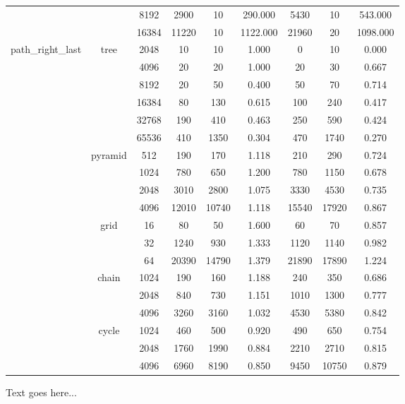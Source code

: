 \begin{table}
{\begin{tabular}{c|c|c|c|c|c|c|c|c}
   &  &  8192 &  2900 & 10 &  290.000  & 5430 & 10 &  543.000 \\
   &  &  16384 &  11220 & 10 &  1122.000  & 21960 & 20 &  1098.000 \\
   \cline{2-9}
   \hline
   \multirow{19}{*}{path\_right\_last} &  \multirow{6}{*}{tree} &  2048 &  10 & 10 &  1.000  & 0 & 10 &  0.000 \\
   &  &  4096 &  20 & 20 &  1.000  & 20 & 30 &  0.667 \\
   &  &  8192 &  20 & 50 &  0.400  & 50 & 70 &  0.714 \\
   &  &  16384 &  80 & 130 &  0.615  & 100 & 240 &  0.417 \\
   &  &  32768 &  190 & 410 &  0.463  & 250 & 590 &  0.424 \\
   &  &  65536 &  410 & 1350 &  0.304  & 470 & 1740 &  0.270 \\
   \cline{2-9}
   &  \multirow{4}{*}{pyramid} &  512 &  190 & 170 &  1.118  & 210 & 290 &  0.724 \\
   &  &  1024 &  780 & 650 &  1.200  & 780 & 1150 &  0.678 \\
   &  &  2048 &  3010 & 2800 &  1.075  & 3330 & 4530 &  0.735 \\
   &  &  4096 &  12010 & 10740 &  1.118  & 15540 & 17920 &  0.867 \\
   \cline{2-9}
   &  \multirow{3}{*}{grid} &  16 &  80 & 50 &  1.600  & 60 & 70 &  0.857 \\
   &  &  32 &  1240 & 930 &  1.333  & 1120 & 1140 &  0.982 \\
   &  &  64 &  20390 & 14790 &  1.379  & 21890 & 17890 &  1.224 \\
   \cline{2-9}
   &  \multirow{3}{*}{chain} &  1024 &  190 & 160 &  1.188  & 240 & 350 &  0.686 \\
   &  &  2048 &  840 & 730 &  1.151  & 1010 & 1300 &  0.777 \\
   &  &  4096 &  3260 & 3160 &  1.032  & 4530 & 5380 &  0.842 \\
   \cline{2-9}
   &  \multirow{3}{*}{cycle} &  1024 &  460 & 500 &  0.920  & 490 & 650 &  0.754 \\
   &  &  2048 &  1760 & 1990 &  0.884  & 2210 & 2710 &  0.815 \\
   &  &  4096 &  6960 & 8190 &  0.850  & 9450 & 10750 &  0.879 \\
   \cline{2-9}
   \hline
\end{tabular}
}
\end{table}

Text goes here...